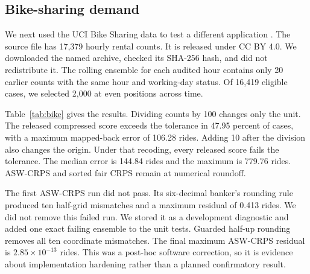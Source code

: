 \documentclass[11pt]{article}
\begin{document}
\subsection{Bike-sharing demand}

We next used the UCI Bike Sharing data to test a different application \cite{bike}. The source file has 17,379 hourly rental counts. It is released under CC BY 4.0. We downloaded the named archive, checked its SHA-256 hash, and did not redistribute it. The rolling ensemble for each audited hour contains only 20 earlier counts with the same hour and working-day status. Of 16,419 eligible cases, we selected 2,000 at even positions across time.

Table~\ref{tab:bike} gives the results. Dividing counts by 100 changes only the unit. The released compressed score exceeds the tolerance in 47.95 percent of cases, with a maximum mapped-back error of 106.28 rides. Adding 10 after the division also changes the origin. Under that recoding, every released score fails the tolerance. The median error is 144.84 rides and the maximum is 779.76 rides. ASW-CRPS and sorted fair CRPS remain at numerical roundoff.

\begin{table}[htbp]
\centering
\caption{Absolute score changes on 2,000 past-only bike-demand forecasts after transformed scores are returned to rides. The tolerance is $2\times10^{-4}$ rides.}
\label{tab:bike}
\small
{}
\end{table}

The first ASW-CRPS run did not pass. Its six-decimal banker's rounding rule produced ten half-grid mismatches and a maximum residual of 0.413 rides. We did not remove this failed run. We stored it as a development diagnostic and added one exact failing ensemble to the unit tests. Guarded half-up rounding removes all ten coordinate mismatches. The final maximum ASW-CRPS residual is $2.85\times10^{-13}$ rides. This was a post-hoc software correction, so it is evidence about implementation hardening rather than a planned confirmatory result.
\end{document}
